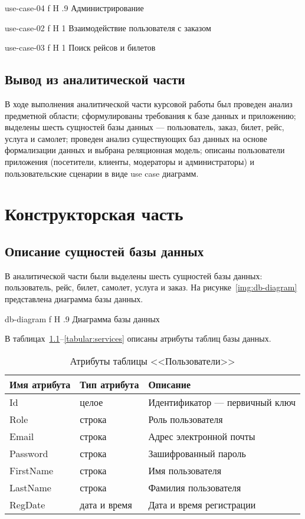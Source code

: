 \documentclass{bmstu}
\begin{document}
    {use-case-04}
    {f}
    {H}
    {.9\textwidth}
    {Администрирование}
    
    {use-case-02}
    {f}
    {H}
    {1\textwidth}
    {Взаимодействие пользователя с заказом}
    
    {use-case-03}
    {f}
    {H}
    {1\textwidth}
    {Поиск рейсов и билетов}

\section*{Вывод из аналитической части}

В ходе выполнения аналитической части курсовой работы был проведен анализ предметной области; сформулированы требования к базе данных и приложению; выделены шесть сущностей базы данных --- пользователь, заказ, билет, рейс, услуга и самолет; проведен анализ существующих баз данных на основе формализации данных и выбрана реляционная модель; описаны пользователи приложения (посетители, клиенты, модераторы и администраторы) и пользовательские сценарии в виде use case диаграмм.

\chapter{Конструкторская часть}

\section{Описание сущностей базы данных}

В аналитической части были выделены шесть сущностей базы данных: пользователь, рейс, билет, самолет, услуга и заказ. 
На рисунке~\ref{img:db-diagram} представлена диаграмма базы данных.

    {db-diagram}
    {f}
    {H}
    {.9\textwidth}
    {Диаграмма базы данных}

В таблицах~\ref{tabular:users}--\ref{tabular:services} описаны атрибуты таблиц базы данных.

\begin{table}[H]
\caption{Атрибуты таблицы <<Пользователи>>}
\label{tabular:users}
\begin{tabular}{|>{\raggedleft}p{4cm}|>{\raggedleft}p{3cm}|>{\raggedleft}p{8cm}|}
\hline
\textbf{Имя атрибута} & \textbf{Тип атрибута} & \textbf{Описание}
\tabularnewline
\hline
Id & целое & Идентификатор --- первичный ключ
\tabularnewline
\hline
Role & строка & Роль пользователя
\tabularnewline
\hline
Email & строка & Адрес электронной почты
\tabularnewline
\hline
Password & строка & Зашифрованный пароль
\tabularnewline
\hline
FirstName & строка & Имя пользователя
\tabularnewline
\hline
LastName & строка & Фамилия пользователя
\tabularnewline
\hline
RegDate & дата и время & Дата и время регистрации
\tabularnewline
\hline
\end{tabular}
\end{table}
\end{document}
